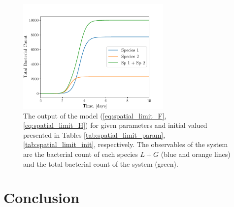 \documentclass[10pt,A4paper]{article}
\begin{document}
%
\begin{figure}[H]
    \begin{center}
    \includegraphics[width=0.67\textwidth]{Figures/pool_model_spatial.pdf}
    \caption{{\footnotesize The output of the model (\ref{eq:spatial_limit_F}, \ref{eq:spatial_limit_H}) for given parameters and initial valued presented in Tables \ref{tab:spatial_limit_param}, \ref{tab:spatial_limit_init}, respectively.
    The observables of the system are the bacterial count of each species $L+G$ (blue and orange lines) and the total bacterial count of the system (green).}}
    \label{fig:spatial_limit_plot1}
    \end{center}
\end{figure}
%
%
%
\section{Conclusion}
\newpage
\printbibliography
%
\end{document}
